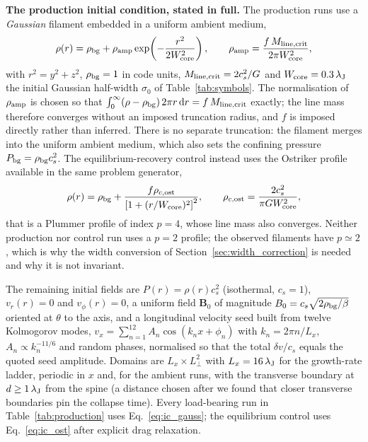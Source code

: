 \documentclass[usenatbib,twoside,twocolumn]{mnras}
\begin{document}
\smallskip\noindent\textbf{The production initial condition, stated in full.} The production runs use a \emph{Gaussian} filament embedded in a uniform ambient medium,
\begin{equation}
\rho(r)=\rho_{\rm bg}+\rho_{\rm amp}\exp\!\left(-\frac{r^{2}}{2W_{\rm core}^{2}}\right),\qquad
\rho_{\rm amp}=\frac{f\,M_{\rm line,crit}}{2\pi W_{\rm core}^{2}},
\label{eq:ic_gauss}
\end{equation}
with $r^{2}=y^{2}+z^{2}$, $\rho_{\rm bg}=1$ in code units, $M_{\rm line,crit}=2c_s^{2}/G$ and $W_{\rm core}=0.3\,\lambda_{\rm J}$ the initial Gaussian half-width $\sigma_0$ of Table~\ref{tab:symbols}. The normalisation of $\rho_{\rm amp}$ is chosen so that $\int_0^\infty(\rho-\rho_{\rm bg})\,2\pi r\,{\rm d}r=f\,M_{\rm line,crit}$ exactly; the line mass therefore converges without an imposed truncation radius, and $f$ is imposed directly rather than inferred. There is no separate truncation: the filament merges into the uniform ambient medium, which also sets the confining pressure $P_{\rm bg}=\rho_{\rm bg}c_s^{2}$. The equilibrium-recovery control instead uses the Ostriker profile available in the same problem generator,
\begin{equation}
\rho(r)=\rho_{\rm bg}+\frac{f\rho_{c,\rm ost}}{\left[1+(r/W_{\rm core})^{2}\right]^{2}},\qquad
\rho_{c,\rm ost}=\frac{2c_s^{2}}{\pi G W_{\rm core}^{2}},
\label{eq:ic_ost}
\end{equation}
that is a Plummer profile of index $p=4$, whose line mass also converges. Neither production nor control run uses a $p=2$ profile; the observed filaments have $p\simeq2$, which is why the width conversion of Section~\ref{sec:width_correction} is needed and why it is not invariant.

The remaining initial fields are $P(r)=\rho(r)c_s^{2}$ (isothermal, $c_s=1$), $v_r(r)=0$ and $v_\phi(r)=0$, a uniform field $\mathbf{B}_0$ of magnitude $B_0=c_s\sqrt{2\rho_{\rm bg}/\beta}$ oriented at $\theta$ to the axis, and a longitudinal velocity seed built from twelve Kolmogorov modes, $v_x=\sum_{n=1}^{12}A_n\cos(k_nx+\phi_n)$ with $k_n=2\pi n/L_x$, $A_n\propto k_n^{-11/6}$ and random phases, normalised so that the total $\delta v/c_s$ equals the quoted seed amplitude. Domains are $L_x\times L_\perp^{2}$ with $L_x=16\,\lambda_{\rm J}$ for the growth-rate ladder, periodic in $x$ and, for the ambient runs, with the transverse boundary at $d\geq1\,\lambda_{\rm J}$ from the spine (a distance chosen after we found that closer transverse boundaries pin the collapse time). Every load-bearing run in Table~\ref{tab:production} uses Eq.~\ref{eq:ic_gauss}; the equilibrium control uses Eq.~\ref{eq:ic_ost} after explicit drag relaxation.
\end{document}

